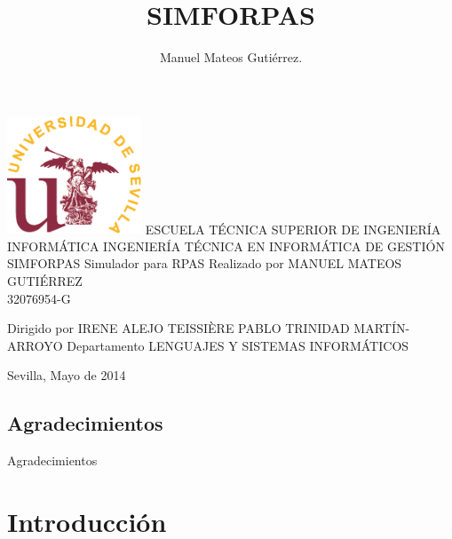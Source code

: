 \documentclass[12pt,a4paper,spanish]{book} %
\date{}
\author{Manuel Mateos Gutiérrez.}
\title{SIMFORPAS}
\let\oldcleardoublepage\cleardoublepage
\renewcommand{\cleardoublepage}{\newpage{\pagestyle{empty}\oldcleardoublepage}}
\begin{document}
\begin{titlepage}
\bfseries
\begin{center}
    \includegraphics[width=0.3\textwidth]{img/LOGO.eps}
    \bigbreak
    \bigbreak
    \bigbreak
    ESCUELA TÉCNICA SUPERIOR DE INGENIERÍA INFORMÁTICA
    \bigbreak
    \bigbreak
    INGENIERÍA TÉCNICA EN INFORMÁTICA DE GESTIÓN
    \bigbreak
    \bigbreak
    \bigbreak
    \bigbreak
    \bigbreak
    \bigbreak
    {\LARGE SIMFORPAS}
    \smallbreak
    {\large Simulador para RPAS}
    \bigbreak
    \bigbreak    
    \bigbreak
    \bigbreak
    \bigbreak
    Realizado por
    \smallbreak
    MANUEL MATEOS GUTIÉRREZ\\
    32076954-G

    \bigbreak
    \bigbreak
    Dirigido por
    \smallbreak
    IRENE ALEJO TEISSI\`ERE
    \smallbreak
    PABLO TRINIDAD MARTÍN-ARROYO
    \bigbreak
    \bigbreak
    Departamento
    \smallbreak
    LENGUAJES Y SISTEMAS INFORMÁTICOS
\end{center}
    \vfill
\begin{flushright}
Sevilla, Mayo de 2014
\end{flushright}
\end{titlepage}

\vspace*{7cm}
\setlength{\parindent}{1cm}
\chapter*{Agradecimientos}
Agradecimientos
\cleardoublepage

\tableofcontents
\listoffigures

\cleardoublepage


\part{Introducción}
\end{document}
